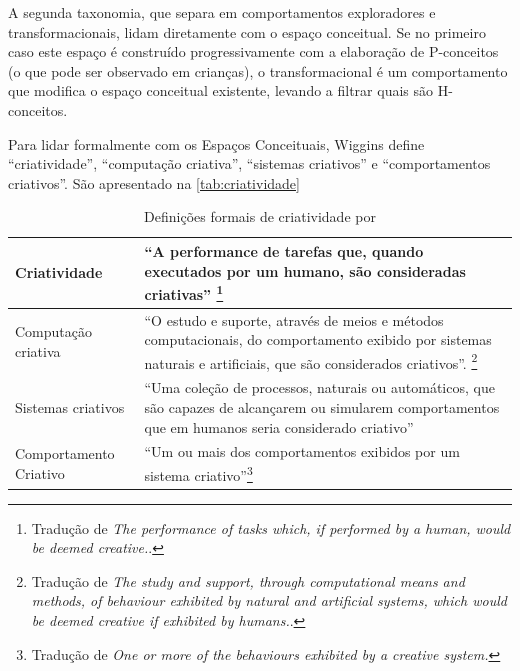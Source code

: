 A segunda taxonomia, que separa em comportamentos exploradores e transformacionais, lidam diretamente com o espaço conceitual. Se no primeiro caso este espaço é construído progressivamente com a elaboração de P-conceitos (o que pode ser observado em crianças), o transformacional é um comportamento que modifica o espaço conceitual existente, levando a filtrar quais são H-conceitos.

Para lidar formalmente com os Espaços Conceituais, Wiggins define ``criatividade'', ``computação criativa'', ``sistemas criativos'' e ``comportamentos criativos''. São apresentado na \autoref{tab:criatividade}

\begin{table}
\caption{Definições formais de criatividade por }
\small
    \begin{tabular}{ | p{4cm} | p{11.25cm} |}
    \hline 
    \hline 

    \tiny{Criatividade} 
    & \tiny{``A performance de tarefas que, quando executados por um humano, são consideradas criativas''  \footnote{Tradução de \emph{The performance of tasks which, if performed by a human, would be deemed creative.}.}} \\
    \hline

    \tiny{Computação criativa} 
    & \tiny{``O estudo e suporte, através de meios e métodos computacionais, do comportamento exibido por sistemas naturais e artificiais, que são considerados criativos''. \footnote{Tradução de \emph{The study and support, through computational means and methods, of behaviour exhibited by natural and artificial systems, which would be deemed creative if exhibited by humans.}.}} \\
    \hline

    \tiny{Sistemas criativos} 
    & \tiny{``Uma coleção de processos, naturais ou automáticos, que são capazes de alcançarem ou simularem comportamentos que em humanos seria considerado criativo''} \\
    \hline

    \tiny{Comportamento Criativo} 
    & \tiny{``Um ou mais dos comportamentos exibidos por um sistema criativo''\footnote{Tradução de \emph{One or more of the behaviours exhibited by a creative system.}}} \\
    \hline
   
    \end{tabular}
\label{tab:criatividade}
\end{table}


